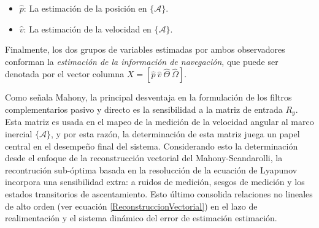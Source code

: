 \documentclass[conference]{IEEEtran}
\newcommand{\marco}[1]{\{\mathcal{#1}\}}
\begin{document}
\begin{itemize}
\item $\hat{p}$: La estimación de la posición en $\marco{A}$.
\item $\hat{v}$: La estimación de la velocidad en $\marco{A}$.
\end{itemize}
Finalmente, los dos grupos de variables estimadas por ambos observadores conforman la \emph{estimación de la información de navegación}, que puede ser denotada por el vector columna $X=[\hat{p}~\hat{v}~\hat{\Theta}~\hat{\Omega}]$.\par

Como señala Mahony, la principal desventaja en la formulación de los filtros complementarios pasivo y directo es la sensibilidad a la matriz de entrada $R_y$. Esta matriz es usada en el mapeo de la medición de la velocidad angular al marco inercial $\marco{A}$, y por esta razón, la determinación de esta matriz juega un papel central en el desempeño final del sistema. Considerando esto la determinación desde el enfoque de la reconstrucción vectorial del Mahony-Scandarolli, la recontrución sub-óptima basada en la resolucción de la ecuación de Lyapunov incorpora una sensibilidad extra: a ruidos de medición, sesgos de medición y los estados transitorios de ascentamiento. Esto último consolida relaciones no lineales de alto orden (ver ecuación \ref{ReconstruccionVectorial}) en el lazo de realimentación y el sistema dinámico del error de estimación estimación.\par
\end{document}
